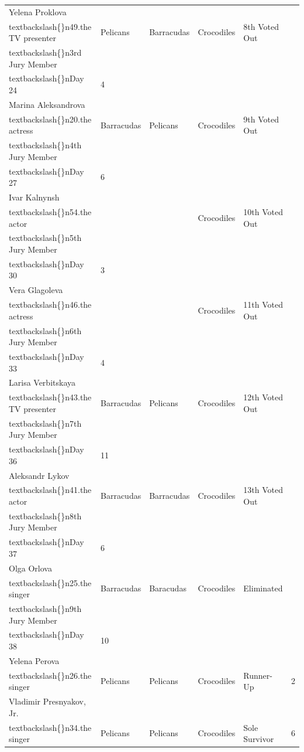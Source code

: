 \documentclass{article}
\begin{document}
\begin{tabular}{llllll}
Yelena Proklova\\textbackslash\{\}n49.the TV presenter & Pelicans & Barracudas & Crocodiles & 8th Voted Out\\textbackslash\{\}n3rd Jury Member\\textbackslash\{\}nDay 24 & 4 \\
Marina Aleksandrova\\textbackslash\{\}n20.the actress & Barracudas & Pelicans & Crocodiles & 9th Voted Out\\textbackslash\{\}n4th Jury Member\\textbackslash\{\}nDay 27 & 6 \\
Ivar Kalnynsh\\textbackslash\{\}n54.the actor &  &  & Crocodiles & 10th Voted Out\\textbackslash\{\}n5th Jury Member\\textbackslash\{\}nDay 30 & 3 \\
Vera Glagoleva\\textbackslash\{\}n46.the actress &  &  & Crocodiles & 11th Voted Out\\textbackslash\{\}n6th Jury Member\\textbackslash\{\}nDay 33 & 4 \\
Larisa Verbitskaya\\textbackslash\{\}n43.the TV presenter & Barracudas & Pelicans & Crocodiles & 12th Voted Out\\textbackslash\{\}n7th Jury Member\\textbackslash\{\}nDay 36 & 11 \\
Aleksandr Lykov\\textbackslash\{\}n41.the actor & Barracudas & Barracudas & Crocodiles & 13th Voted Out\\textbackslash\{\}n8th Jury Member\\textbackslash\{\}nDay 37 & 6 \\
Olga Orlova\\textbackslash\{\}n25.the singer & Barracudas & Baracudas & Crocodiles & Eliminated\\textbackslash\{\}n9th Jury Member\\textbackslash\{\}nDay 38 & 10 \\
Yelena Perova\\textbackslash\{\}n26.the singer & Pelicans & Pelicans & Crocodiles & Runner-Up & 2 \\
Vladimir Presnyakov, Jr.\\textbackslash\{\}n34.the singer & Pelicans & Pelicans & Crocodiles & Sole Survivor & 6 \\
\bottomrule
\end{tabular}
\end{document}
